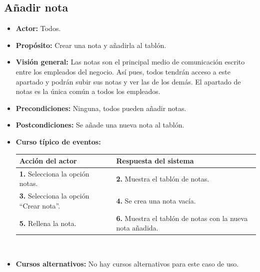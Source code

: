 \documentclass[spanish,a4paper,11pt, twoside]{report}	%
\begin{document}
	\subsection{Añadir nota} 
			\begin{itemize}
			\item \textbf{Actor:} Todos.
			\item \textbf{Propósito:} Crear una nota y añadirla al tablón.
			\item \textbf{Visión general:} Las notas son el principal medio de comunicación
				escrito entre los empleados del negocio.   Así pues, todos tendrán acceso a este
				apartado y podrán subir sus notas y ver las de los demás. El apartado de notas es
				la única común a todos los empleados.
			\item \textbf{Precondiciones:} Ninguna, todos pueden añadir notas.
			\item \textbf{Postcondiciones:} Se añade una nueva nota al tablón.
			\item \textbf{Curso típico de eventos:} 	\\
				\begin{tabular}{|p{6cm}||p{6cm}|}
				\hline
				\textbf{Acción del actor} & \textbf{Respuesta del sistema} \\ \hline \hline
				\textbf{1.} Selecciona la opción notas. & 
				\textbf{2.} Muestra el tablón de notas. \\ \hline
				\textbf{3.} Selecciona la opción ``Crear nota''.	& 
				\textbf{4.} Se crea una nota vacía. \\ \hline
				\textbf{5.} Rellena la nota.	& 
				\textbf{6.} Muestra el tablón de notas con la nueva nota añadida. \\ \hline
			\end{tabular}
			\\
			\item \textbf{Cursos alternativos:} No hay cursos alternativos para este caso de uso.
		\end {itemize}


\end{document}

